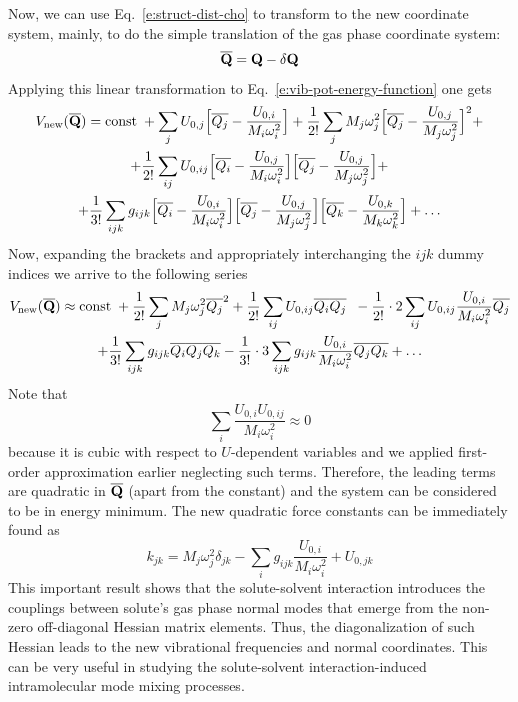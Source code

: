 \documentclass[a4paper,titlepage,twoside,fleqn,12pt]{book}
\begin{document}
\begin{refsection}
Now, we can use Eq.~\eqref{e:struct-dist-cho} to transform to the new coordinate system, mainly,
to do the simple translation of the gas phase coordinate system:
%
\begin{equation} \label{e:struct-dist-cho-transl}
\overline{\bf Q} = {\bf Q} - \delta {\bf Q}
\end{equation}
%
Applying this linear transformation to Eq.~\eqref{e:vib-pot-energy-function} one gets
%
\begin{multline}\label{exp}
V_{\rm new}(\overline{\bf Q}) = {\rm const}\;+\sum_j U_{0,j}\Big[\overline{Q_j}-\frac{U_{0,i}}{M_i\omega_i^2}\Big]
+ \frac{1}{2!} \sum_j M_j \omega_j^2 \Big[\overline{Q_j} - \frac{U_{0,j}}{M_j\omega_j^2}\Big]^2  +  \\
+ \frac{1}{2!} \sum_{ij} U_{0,ij} \Big[\overline{Q_i} - \frac{U_{0,j}}{M_i\omega_i^2}\Big] 
\Big[\overline{Q_j} - \frac{U_{0,j}}{M_j\omega_j^2}\Big] +  \\
+ \frac{1}{3!} \sum_{ijk} g_{ijk}  
\Big[\overline{Q_i} - \frac{U_{0,i}}{M_i\omega_i^2}\Big]
\Big[\overline{Q_j} - \frac{U_{0,j}}{M_j\omega_j^2}\Big]
\Big[\overline{Q_k} - \frac{U_{0,k}}{M_k\omega_k^2}\Big]  
+ \ldots
\end{multline}
%
Now, expanding the brackets and
appropriately interchanging the $ijk$ dummy indices we arrive to the following
series
%
\begin{multline}\label{exp2}
V_{\rm new}(\overline{\bf Q}) \approx {\rm const}\; 
+ \frac{1}{2!} \sum_j M_j \omega_j^2 \overline{Q_j}^2 
+ \frac{1}{2!} \sum_{ij} U_{0,ij} \overline{Q_i} \overline{Q_j} \;\;
 - \frac{1}{2!} \cdot 2 \sum_{ij} U_{0,ij} \frac{U_{0,i}}{M_i\omega_i^2} \overline{Q_j} \\
+ \frac{1}{3!} \sum_{ijk} g_{ijk} \overline{Q_i}\overline{Q_j}\overline{Q_k}  
- \frac{1}{3!} \cdot 3\sum_{ijk} g_{ijk} \frac{U_{0,i}}{M_i\omega_i^2} \overline{Q_j}\overline{Q_k} 
+ \ldots
\end{multline}
%
Note that
%
\begin{equation}
\sum_i \frac{ U_{0,i} U_{0,ij} }{M_i\omega_i^2}  \approx 0
\end{equation}
%
because it is cubic with respect to $U$\hyp{}dependent variables and we
applied first\hyp{}order approximation earlier neglecting such terms. 
Therefore, the leading terms are quadratic in $\overline{\bf Q}$
(apart from the constant) and the system can be considered to be in energy minimum.
The new quadratic force constants can be immediately found as
%
\begin{equation} \label{e:force-const-cho}
\boxed{
 k_{jk} = M_j \omega_j^2 \delta_{jk} - \sum_i g_{ijk} \frac{U_{0,i}}{M_i\omega_i^2} + U_{0,jk}
}
\end{equation}
%
This important result shows that the solute-solvent interaction
introduces the couplings between solute's gas phase
normal modes that emerge from the non\hyp{}zero off\hyp{}diagonal
Hessian matrix elements. Thus, the diagonalization of such
Hessian leads to the new vibrational frequencies and normal
coordinates. This can be very useful in studying the solute\hyp{}solvent 
interaction\hyp{}induced intramolecular mode
mixing processes.


\end{refsection}
\end{document}
